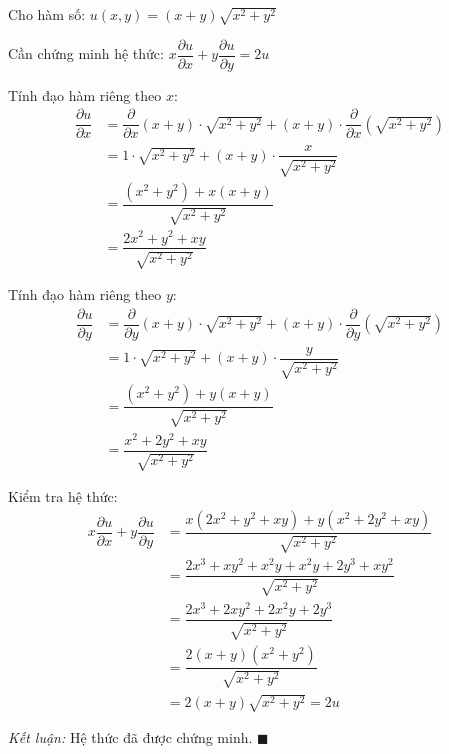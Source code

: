 \begin{solution}
Cho hàm số: $u(x, y) = (x + y)\sqrt{x^2 + y^2}$

Cần chứng minh hệ thức: $x\dfrac{\partial u}{\partial x} + y\dfrac{\partial u}{\partial y} = 2u$

\textit{} Tính đạo hàm riêng theo $x$:
\begin{align*}
    \dfrac{\partial u}{\partial x} &= \dfrac{\partial}{\partial x}(x+y) \cdot \sqrt{x^2 + y^2} + (x + y) \cdot \dfrac{\partial}{\partial x}(\sqrt{x^2 + y^2}) \\
    &= 1 \cdot \sqrt{x^2 + y^2} + (x + y) \cdot \dfrac{x}{\sqrt{x^2 + y^2}} \\
    &= \dfrac{(x^2 + y^2) + x(x + y)}{\sqrt{x^2 + y^2}} \\
    &= \dfrac{2x^2 + y^2 + xy}{\sqrt{x^2 + y^2}}
\end{align*}

\textit{} Tính đạo hàm riêng theo $y$:
\begin{align*}
    \dfrac{\partial u}{\partial y} &= \dfrac{\partial}{\partial y}(x+y) \cdot \sqrt{x^2 + y^2} + (x + y) \cdot \dfrac{\partial}{\partial y}(\sqrt{x^2 + y^2}) \\
    &= 1 \cdot \sqrt{x^2 + y^2} + (x + y) \cdot \dfrac{y}{\sqrt{x^2 + y^2}} \\
    &= \dfrac{(x^2 + y^2) + y(x + y)}{\sqrt{x^2 + y^2}} \\
    &= \dfrac{x^2 + 2y^2 + xy}{\sqrt{x^2 + y^2}}
\end{align*}

\textit{} Kiểm tra hệ thức:
\begin{align*}
    x\dfrac{\partial u}{\partial x} + y\dfrac{\partial u}{\partial y} &= \dfrac{x(2x^2 + y^2 + xy) + y(x^2 + 2y^2 + xy)}{\sqrt{x^2 + y^2}} \\
    &= \dfrac{2x^3 + xy^2 + x^2y + x^2y + 2y^3 + xy^2}{\sqrt{x^2 + y^2}} \\
    &= \dfrac{2x^3 + 2xy^2 + 2x^2y + 2y^3}{\sqrt{x^2 + y^2}} \\
    &= \dfrac{2(x+y)(x^2+y^2)}{\sqrt{x^2 + y^2}} \\
    &= 2(x + y)\sqrt{x^2 + y^2} = 2u
\end{align*}

\textit{Kết luận:} Hệ thức đã được chứng minh. $\blacksquare$
\end{solution}

